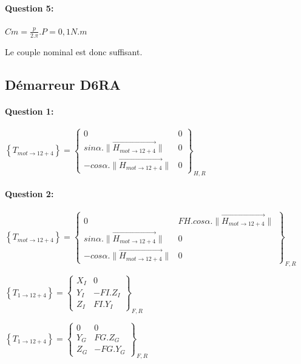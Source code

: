 \paragraph{Question 5:}

$Cm=\frac{p}{2.\pi}.P=0,1N.m$

Le couple nominal est donc suffisant.

\subsection{Démarreur D6RA}

\paragraph{Question 1:}

$\left\{T_{mot\rightarrow 12+4}\right\}=\left\{
\begin{array}{cc}
0 & 0 \\
sin\alpha.\|\overrightarrow{H_{mot\rightarrow 12+4}}\| & 0 \\
-cos\alpha.\|\overrightarrow{H_{mot\rightarrow 12+4}}\| & 0
\end{array}
\right\}_{H,R}$

\paragraph{Question 2:}

$\left\{T_{mot\rightarrow 12+4}\right\}=\left\{
\begin{array}{cc}
0 & FH.cos\alpha.\|\overrightarrow{H_{mot\rightarrow 12+4}}\| \\
sin\alpha.\|\overrightarrow{H_{mot\rightarrow 12+4}}\| & 0 \\
-cos\alpha.\|\overrightarrow{H_{mot\rightarrow 12+4}}\| & 0
\end{array}
\right\}_{F,R}$

$\left\{T_{1\rightarrow 12+4}\right\}=\left\{
\begin{array}{cc}
X_I & 0 \\
Y_I & -FI.Z_I \\
Z_I & FI.Y_I
\end{array}
\right\}_{F,R}$

$\left\{T_{1\rightarrow 12+4}\right\}=\left\{
\begin{array}{cc}
0 & 0 \\
Y_G & FG.Z_G \\
Z_G & -FG.Y_G
\end{array}
\right\}_{F,R}$


